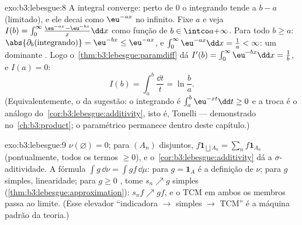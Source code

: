 \begin{solution}{exo:b3:lebesgue:8}
A integral converge: perto de $0$ o integrando tende a $b - a$
(limitado), e ele decai como $\eu^{-ax}$ no infinito. Fixe $a$
e veja $I(b) = \int_0^\infty\frac{\eu^{-ax} -
\eu^{-bx}}x\dd x$ como função de $b \in \intco a{+\infty}$.
Para todo $b \geq a$: $\abs{\partial_b(\text{integrando})} =
\eu^{-bx} \leq \eu^{-ax}$, e $\int_0^\infty\eu^{-ax}\dd x =
\frac1a < \infty$: um dominante . Logo
o~\cref{thm:b3:lebesgue:paramdiff} dá $I'(b) =
\int_0^\infty\eu^{-bx}\dd x = \frac1b$, e $I(a) = 0$:
\[
I(b) = \int_a^b\frac{\dd t}t = \ln\frac ba .
\]
(Equivalentemente, o  da sugestão: o integrando é
$\int_a^b\eu^{-xt}\dd t \geq 0$ e a troca é o análogo
 do~\cref{cor:b3:lebesgue:additivity},
isto é, Tonelli --- demonstrado no~\cref{ch:b3:product}; o
 paramétrico permanece dentro deste capítulo.)
\end{solution}

\begin{solution}{exo:b3:lebesgue:9}
$\nu(\varnothing) = 0$; para $(A_n)$ disjuntos, $f\mathbf
1_{\bigsqcup A_n} = \sum_nf\mathbf 1_{A_n}$ (pontualmente, todos
os termos $\geq 0$), e o~\cref{cor:b3:lebesgue:additivity} dá a
$\sigma$-aditividade. A fórmula $\int g\,\dd\nu = \int
gf\,\dd\mu$: para $g = \mathbf 1_A$ é a definição de
$\nu$; para $g$ simples, linearidade; para $g \geq 0$ ,
tome $s_n \nearrow g$ simples
(\cref{thm:b3:lebesgue:approximation}): $s_nf \nearrow gf$, e o
TCM em ambos os membros passa ao limite. (Esse elevador ``indicadora
$\to$ simples $\to$ TCM'' é a máquina padrão da
teoria.)
\end{solution}

